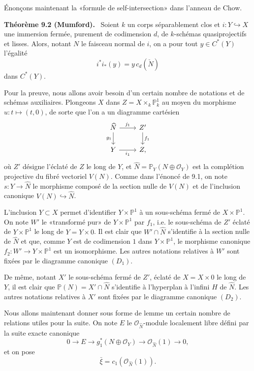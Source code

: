 \documentclass[11pt]{article}
\newenvironment{statement}[1]{\par\medskip\noindent\textbf{#1.}\ }{\par\medskip}
\begin{document}
Énonçons maintenant la «formule de self-intersection» dans l'anneau de Chow.

\begin{statement}{Théorème 9.2 (Mumford)}
Soient $k$ un corps séparablement clos et $i:Y\hookrightarrow X$ une immersion fermée, purement de codimension $d$, de $k$-schémas quasiprojectifs et lisses. Alors, notant $N$ le faisceau normal de $i$, on a pour tout $y\in C^*(Y)$ l'égalité
\[
i^*i_*(y)=y\,c_d(\check N)
\]
dans $C^*(Y)$.
\end{statement}

Pour la preuve, nous allons avoir besoin d'un certain nombre de notations et de schémas auxiliaires. Plongeons $X$ dans $Z=X\times_k\mathbb P^1_k$ au moyen du morphisme $u:t\mapsto(t,0)$, de sorte que l'on a un diagramme cartésien
\[
\begin{tikzcd}
\widehat N \arrow[r,"j_1"] \arrow[d,"g_1"'] & Z' \arrow[d,"f_1"]\\
Y \arrow[r,"i_1"'] & Z ,
\end{tikzcd}
\]
où $Z'$ désigne l'éclaté de $Z$ le long de $Y$, et $\widehat N=\mathbb P_Y(N\oplus\mathcal O_Y)$ est la complétion projective du fibré vectoriel $V(N)$. Comme dans l'énoncé de 9.1, on note $s:Y\to\widehat N$ le morphisme composé de la section nulle de $V(N)$ et de l'inclusion canonique $V(N)\hookrightarrow\widehat N$.

L'inclusion $Y\subset X$ permet d'identifier $Y\times\mathbb P^1$ à un sous-schéma fermé de $X\times\mathbb P^1$. On note $W'$ le «transformé pur» de $Y\times\mathbb P^1$ par $f_1$, i.e. le sous-schéma de $Z'$ éclaté de $Y\times\mathbb P^1$ le long de $Y=Y\times0$. Il est clair que $W'\cap\widehat N$ s'identifie à la section nulle de $\widehat N$ et que, comme $Y$ est de codimension $1$ dans $Y\times\mathbb P^1$, le morphisme canonique $f_2:W'\to Y\times\mathbb P^1$ est un isomorphisme. Les autres notations relatives à $W'$ sont fixées par le diagramme canonique $(D_1)$.

De même, notant $X'$ le sous-schéma fermé de $Z'$, éclaté de $X=X\times0$ le long de $Y$, il est clair que $\mathbb P(N)=X'\cap\widehat N$ s'identifie à l'hyperplan à l'infini $H$ de $\widehat N$. Les autres notations relatives à $X'$ sont fixées par le diagramme canonique $(D_2)$.

Nous allons maintenant donner sous forme de lemme un certain nombre de relations utiles pour la suite. On note $E$ le $\mathcal O_{\widehat N}$-module localement libre défini par la suite exacte canonique
\[
0\to E\to g_1^*(N\oplus\mathcal O_Y)\to\mathcal O_{\widehat N}(1)\to0,
\tag{9.3.0}
\]
et on pose
\[
\bar\xi=c_1(\mathcal O_{\widehat N}(1)).
\tag{9.3.1}
\]
\end{document}
